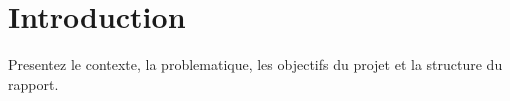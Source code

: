 \section{Introduction}

Presentez le contexte, la problematique, les objectifs du projet et la structure du rapport.
